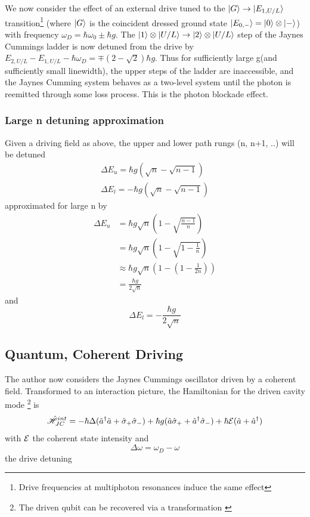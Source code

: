We now consider the effect of an external drive tuned to the $| G \rangle \rightarrow | E_{1, U/L} \rangle$ transition\footnote{Drive frequencies at multiphoton resonances induce the same effect} (where $| G \rangle$ is the coincident dressed ground state $| E_{0, -} \rangle = | 0 \rangle \otimes | - \rangle$) with frequency $\omega_D = \hbar \omega_0 \pm \hbar g$.
The $| 1 \rangle \otimes | U/L \rangle \rightarrow | 2 \rangle \otimes | U/L \rangle$ step of the Jaynes Cummings ladder is now detuned from the drive by $E_{2, U/L} - E_{1, U/L} - \hbar \omega_D =  \mp(2-\sqrt{2}) \hbar g$. Thus for sufficiently large g(and sufficiently small linewidth), the upper steps of the ladder are inaccessible, and the Jaynes Cumming system behaves as a two-level system until the photon is reemitted through some loss process. This is the photon blockade effect.
\subsubsection{Large n detuning approximation}
Given a driving field as above, the upper and lower path rungs (n, n+1, ..) will be detuned
\begin{align}
	\Delta E_u = \hbar g (\sqrt{n}-\sqrt{n-1}) \\
	\Delta E_l = -\hbar g (\sqrt{n}-\sqrt{n-1})
\end{align}
approximated for large n by
\begin{align}
	\Delta E_u &= \hbar g \sqrt{n} \left (1-\sqrt{\frac{n-1}{n}} \right ) \\
	&= \hbar g \sqrt{n} \left (1-\sqrt{1-\frac{1}{n}} \right ) \\
	& \approx \hbar g \sqrt{n} \left ( 1- \left ( 1 - \frac{1}{2n} \right ) \right ) \\
	&= \frac{\hbar g}{2 \sqrt{n}}
\end{align}
and
\begin{equation}
	\Delta E_l = -\frac{\hbar g}{2 \sqrt{n}}
\end{equation}
\subsection{Quantum, Coherent Driving}
The author now considers the Jaynes Cummings oscillator driven by a coherent field. Transformed to an interaction picture, the Hamiltonian for the driven cavity mode \footnote{The driven qubit can be recovered via a transformation \autocite{Alsing1999}} is
\begin{equation}
	\hat{\mathscr{H}}_{JC}^{int} = -\hbar \Delta (\hat{a}^\dagger \hat{a} + \hat{\sigma}_+ \hat{\sigma}_-) + \hbar g(\hat{a} \hat{\sigma}_+ + \hat{a}^\dagger \hat{\sigma}_-) + \hbar \mathcal{E}(\hat{a} + \hat{a}^\dagger)
\end{equation}
with $\mathcal{E}$ the coherent state intensity and
\begin{equation}
	\Delta \omega = \omega_D - \omega
\end{equation}
the drive detuning

